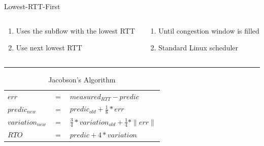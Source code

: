 \documentclass{beamer}
\begin{document}
\begin{frame}{Lowest-RTT-First}
  \begin{columns}
    \begin{column}{0.48\textwidth}
      \begin{enumerate}
        \setlength\itemsep{1.2em}
        \item Uses the subflow with the lowest RTT
              \setcounter{enumi}{2}
        \item Use next lowest RTT
      \end{enumerate}
    \end{column}

    \begin{column}{0.48\textwidth}
      \begin{enumerate}
        \setlength\itemsep{1.2em}
        \setcounter{enumi}{1}
        \item Until congestion window is filled
              \setcounter{enumi}{3}
        \item Standard Linux scheduler
      \end{enumerate}
    \end{column}
  \end{columns}

  \vspace{0.8cm}
  {\color{uos-red-full}\rule{\textwidth}{1.5pt}}

  \begin{table}[]
    \begin{tabular}{@{}lll@{}}
      \(err\)             & \(=\) & \(measured_{RTT} - predic\)                               \\
      \(predic_{new}\)    & \(=\) & \(predic_{old} + \frac{1}{8} * err\)                      \\
      \(variation_{new}\) & \(=\) & \(\frac{3}{4} * variation_{old} + \frac{1}{4} * \|err\|\) \\
      \(RTO\)             & \(=\) & \(predic + 4 * variation\)
    \end{tabular}
    \caption{\small Jacobson’s Algorithm}
  \end{table}
\end{frame}
\end{document}

